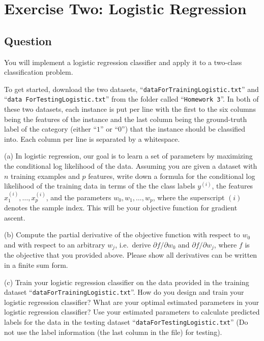\documentclass[a4paper, utf8]{ctexart}
\begin{document}
	\section{Exercise Two: Logistic Regression}
	
	\subsection{Question}
	
	You will implement a logistic regression classifier and apply it to a two-class classification problem. 
	
	To get started, download the two datasets, ``\verb|dataForTrainingLogistic.txt|'' and ``\verb|data|\ \verb|ForTestingLogistic.txt|'' from the folder called ``\verb|Homework 3|''. In both of these two datasets, each instance is put per line with the first to the six columns being the features of the instance and the last column being the ground-truth label of the category (either ``$1$'' or ``$0$'') that the instance should be classified into. Each column per line is separated by a whitespace.
	
	\vspace{.5em}
	
	(a) In logistic regression, our goal is to learn a set of parameters by maximizing the conditional log likelihood of the data. Assuming you are given a dataset with $n$ training examples and $p$ features, write down a formula for the conditional log likelihood of the training data in terms of the the class labels $y^{(i)}$, the features $x^{(i)}_1, \ldots, x^{(i)}_p$, and the parameters $w_0, w_1, \ldots, w_p$, where the superscript $(i)$ denotes the sample index. This will be your objective function for gradient ascent.
	
	\vspace{.5em}
	
	(b) Compute the partial derivative of the objective function with respect to $w_0$ and with respect to an arbitrary $w_j$, i.e.~derive $\partial f / \partial w_0$ and $\partial f / \partial w_j$, where $f$ is the objective that you provided above.
	Please show all derivatives can be written in a finite sum form.
	
	\vspace{.5em}
	
	(c) Train your logistic regression classifier on the data provided in the training dataset ``\verb|dataForTrainingLogistic.txt|''. How do you design and train your logistic regression classifier? What are your optimal estimated parameters in your logistic regression classifier? Use your estimated parameters  to calculate predicted labels for the data in the testing dataset ``\verb|dataForTestingLogistic.txt|'' (Do not use the label information (the last column in the file) for testing).
	
\end{document}
